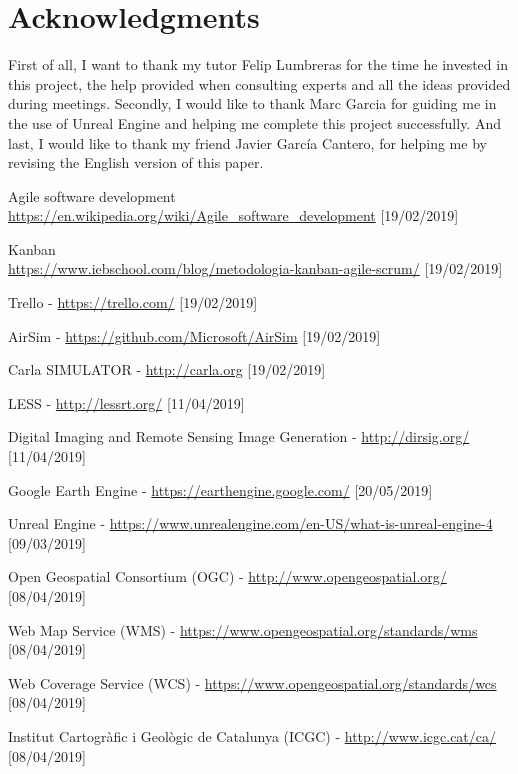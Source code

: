 \documentclass[10pt,a4paper,twocolumn,twoside]{article}
\begin{document}
\section*{Acknowledgments}

First of all, I want to thank  my tutor Felip Lumbreras for the time he invested in this project, the help provided when consulting experts and all the ideas provided during meetings. Secondly, I would like to thank Marc Garcia for guiding me in the use of Unreal Engine and helping me complete this project successfully. And last, I would like to thank my friend Javier García Cantero, for helping me by revising the English version of this paper.

\begin{thebibliography}{11}
Agile software development
\\ \url{https://en.wikipedia.org/wiki/Agile_software_development}
[19/02/2019]
 
Kanban
\\ \url{https://www.iebschool.com/blog/metodologia-kanban-agile-scrum/} [19/02/2019]

Trello - \url{https://trello.com/} [19/02/2019]

AirSim - \url{https://github.com/Microsoft/AirSim} [19/02/2019]

Carla SIMULATOR - \url{http://carla.org} [19/02/2019]

LESS - \url{http://lessrt.org/} [11/04/2019]

Digital Imaging and Remote Sensing Image Generation - \url{http://dirsig.org/} [11/04/2019]

Google Earth Engine - \url{https://earthengine.google.com/} [20/05/2019]

Unreal Engine - \url{https://www.unrealengine.com/en-US/what-is-unreal-engine-4} [09/03/2019]

Open Geospatial Consortium (OGC) -  \url{http://www.opengeospatial.org/} [08/04/2019]

Web Map Service (WMS) -  \url{https://www.opengeospatial.org/standards/wms} [08/04/2019]

Web Coverage Service (WCS) -  \url{https://www.opengeospatial.org/standards/wcs} [08/04/2019]

Institut Cartogràfic i Geològic de Catalunya (ICGC) - \url{http://www.icgc.cat/ca/} [08/04/2019]


\end{thebibliography}
\end{document}
